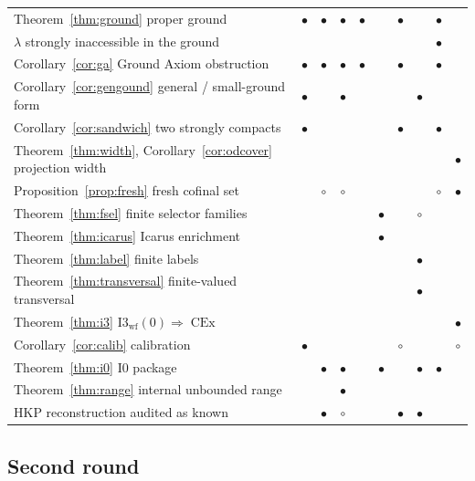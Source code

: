 \documentclass[11pt,letterpaper]{article}
\theoremstyle{definition}
\numberwithin{equation}{section}
\newcommand{\CEx}{\operatorname{CEx}}
\newcommand{\Izero}{\mathrm{I0}}
\newcommand{\Iwf}{\mathrm{I3}_{\mathrm{wf}}(0)}
\newcommand{\yes}{$\bullet$}
\newcommand{\prt}{$\circ$}
\begin{document}
\begin{longtable}{@{}P{.47\textwidth}CCCCCCCCC@{}}
Theorem~\ref{thm:ground} proper ground&\yes&\yes&\yes&\yes&&\yes&&\yes&\\
\quad $\lambda$ strongly inaccessible in the ground&&&&&&&&\yes&\\
Corollary~\ref{cor:ga} Ground Axiom obstruction&\yes&\yes&\yes&\yes&&\yes&&\yes&\\
Corollary~\ref{cor:gengound} general / small-ground form&\yes&&\yes&&&&\yes&&\\
Corollary~\ref{cor:sandwich} two strongly compacts&\yes&&&&&\yes&&\yes&\\
Theorem~\ref{thm:width}, Corollary~\ref{cor:odcover} projection width&&&&&&&&&\yes\\
Proposition~\ref{prop:fresh} fresh cofinal set&&\prt&\prt&&&&&\prt&\yes\\
Theorem~\ref{thm:fsel} finite selector families&&&&&\yes&&\prt&&\\
Theorem~\ref{thm:icarus} Icarus enrichment&&&&&\yes&&&&\\
Theorem~\ref{thm:label} finite labels&&&&&&&\yes&&\\
Theorem~\ref{thm:transversal} finite-valued transversal&&&&&&&\yes&&\\
Theorem~\ref{thm:i3} $\Iwf\Rightarrow\CEx$&&&&&&&&&\yes\\
Corollary~\ref{cor:calib} calibration&\yes&&&&&\prt&&&\prt\\
Theorem~\ref{thm:i0} $\Izero$ package&&\yes&\yes&&\yes&&\yes&\yes&\\
Theorem~\ref{thm:range} internal unbounded range&&&\yes&&&&&&\\
HKP reconstruction audited as known&&\yes&\prt&&&\yes&\yes&&\\
\bottomrule
\end{longtable}
\endgroup

\subsection*{Second round}
\end{document}
